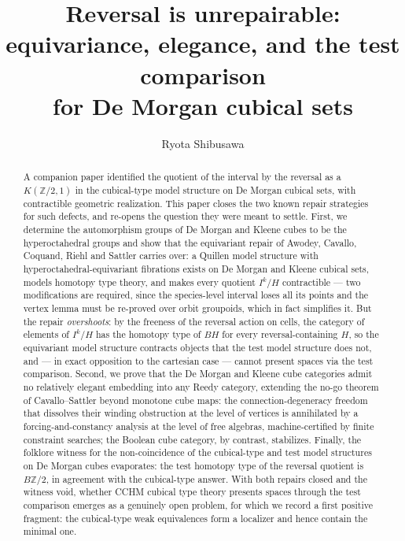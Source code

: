 \documentclass[11pt]{amsart}
\theoremstyle{definition}
\begin{document}
\title[Reversal is unrepairable]{Reversal is unrepairable:\\
  equivariance, elegance, and the test comparison\\ for De Morgan
  cubical sets}

\author{Ryota Shibusawa}
\address{Daiichi Institute of Technology, Japan}


\begin{abstract}
  A companion paper identified the quotient of the interval by the
  reversal as a $K(\mathbb{Z}/2,1)$ in the cubical-type model
  structure on De Morgan cubical sets, with contractible geometric
  realization.  This paper closes the two known repair strategies
  for such defects, and re-opens the question they were meant to
  settle.  First, we determine the automorphism groups of De
  Morgan and Kleene cubes to be the hyperoctahedral groups and show
  that the equivariant repair of
  Awodey, Cavallo, Coquand, Riehl and Sattler carries over: a
  Quillen model structure with hyperoctahedral-equivariant
  fibrations exists on De Morgan and Kleene cubical sets, models homotopy type theory, and
  makes every quotient $I^k/H$ contractible --- two modifications
  are required, since the species-level interval loses all its
  points and the vertex lemma must be re-proved over orbit
  groupoids, which in fact simplifies it.  But the repair
  \emph{overshoots}: by the freeness of the reversal action on
  cells, the category of elements of $I^k/H$ has the homotopy type
  of $BH$ for every reversal-containing $H$, so the equivariant
  model structure contracts objects that the test model structure
  does not, and --- in exact opposition to the cartesian case ---
  cannot present spaces via the test comparison.  Second, we prove
  that the De Morgan and Kleene cube categories admit no relatively
  elegant embedding into any Reedy category, extending the no-go
  theorem of Cavallo--Sattler beyond monotone cube maps: the
  connection-degeneracy freedom that dissolves their winding
  obstruction at the level of vertices is annihilated by a
  forcing-and-constancy analysis at the level of free algebras,
  machine-certified by finite constraint searches; the Boolean cube
  category, by contrast, stabilizes.  Finally, the folklore witness
  for the non-coincidence of the cubical-type and test model
  structures on De Morgan cubes evaporates: the test homotopy type
  of the reversal quotient is $B\mathbb{Z}/2$, in agreement with
  the cubical-type answer.  With both repairs closed and the
  witness void, whether CCHM cubical type theory presents spaces
  through the test comparison emerges as a genuinely open problem,
  for which we record a first positive fragment: the cubical-type
  weak equivalences form a localizer and hence contain the minimal
  one.
\end{abstract}
\end{document}
